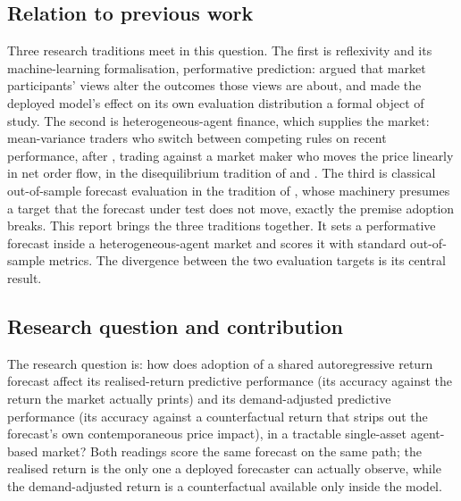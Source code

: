 \documentclass[12pt]{article}
\begin{document}
\subsection{Relation to previous work}

Three research traditions meet in this question. The first is reflexivity and its machine-learning formalisation, performative prediction: \citet{soros1987} argued that market participants' views alter the outcomes those views are about, and \citet{perdomo2020} made the deployed model's effect on its own evaluation distribution a formal object of study. The second is heterogeneous-agent finance, which supplies the market: mean-variance traders who switch between competing rules on recent performance, after \citet{brockhommes1998}, trading against a market maker who moves the price linearly in net order flow, in the disequilibrium tradition of \citet{beja1980} and \citet{farmerjoshi2002}. The third is classical out-of-sample forecast evaluation in the tradition of \citet{diebold1995}, whose machinery presumes a target that the forecast under test does not move, exactly the premise adoption breaks. This report brings the three traditions together. It sets a performative forecast inside a heterogeneous-agent market and scores it with standard out-of-sample metrics. The divergence between the two evaluation targets is its central result. %

\subsection{Research question and contribution}

The research question is: how does adoption of a shared autoregressive return forecast affect its realised-return predictive performance (its accuracy against the return the market actually prints) and its demand-adjusted predictive performance (its accuracy against a counterfactual return that strips out the forecast's own contemporaneous price impact), in a tractable single-asset agent-based market? %
Both readings score the same forecast on the same path; the realised return is the only one a deployed forecaster can actually observe, while the demand-adjusted return is a counterfactual available only inside the model. %
\end{document}
